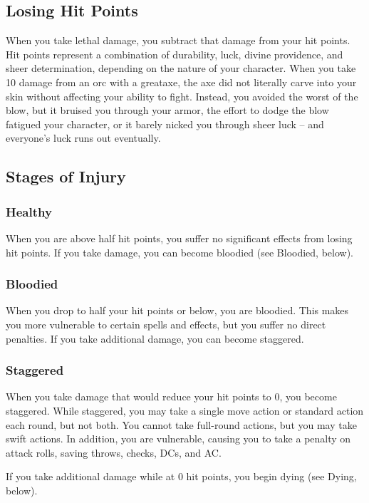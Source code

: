 \subsection{Losing Hit Points}
When you take lethal damage, you subtract that damage from your hit points.
 Hit points represent a combination of durability, luck, divine providence, and sheer determination, depending on the nature of your character. When you take 10 damage from an orc with a greataxe, the axe did not literally carve into your skin without affecting your ability to fight. Instead, you avoided the worst of the blow, but it bruised you through your armor, the effort to dodge the blow fatigued your character, or it barely nicked you through sheer luck -- and everyone's luck runs out eventually.

\subsection{Stages of Injury}

\subsubsection{Healthy} 
When you are above half hit points, you suffer no significant effects from losing hit points. If you take damage, you can become bloodied (see Bloodied, below).

\subsubsection{Bloodied}
When you drop to half your hit points or below, you are bloodied. This makes you more vulnerable to certain spells and effects, but you suffer no direct penalties. If you take additional damage, you can become staggered.

\subsubsection{Staggered}
When you take damage that would reduce your hit points to 0, you become staggered. While staggered, you may take a single move action or standard action each round, but not both. You cannot take full-round actions, but you may take swift actions. In addition, you are vulnerable, causing you to take a  penalty on attack rolls, saving throws, checks, DCs, and AC.

If you take additional damage while at 0 hit points, you begin dying (see Dying, below).

